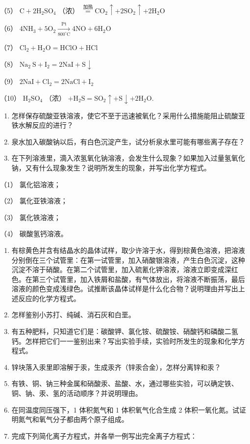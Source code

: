 （5） \(\mathrm{C} + 2\mathrm{H}_2\mathrm{SO}_4\) （浓）
\(\overset{\text{加热}}{=}\mathrm{CO}_2\uparrow +2\mathrm{SO}_2\uparrow +2\mathrm{H}_2\mathrm{O}\)

（6）
\(4\mathrm{NH}_{3} + 5\mathrm{O}_{2}\xrightarrow[\mathrm{800}^{\circ}\mathrm{C}]{\mathrm{Pt}}4\mathrm{NO} + 6\mathrm{H}_{2}\mathrm{O}\)

（7）
\(\mathrm{Cl}_2 + \mathrm{H}_2\mathrm{O} = \mathrm{HClO} + \mathrm{HCl}\)

（8）
\(\mathrm{Na}_{2} \mathrm{~S} + \mathrm{I}_{2} = 2 \mathrm{NaI} + \mathrm{S} \downarrow\)

（9） \(2\mathrm{NaI} + \mathrm{Cl}_2 = 2\mathrm{NaCl} + \mathrm{I}_2\)

（10） \(\mathrm{H}_2\mathrm{SO}_4\) （浓）
\(+\mathrm{H}_2\mathrm{S} = \mathrm{SO}_2\uparrow +\mathrm{S}\downarrow +2\mathrm{H}_2\mathrm{O}.\)

\begin{enumerate}[start=10]
\item
  怎样保存硫酸亚铁溶液，使它不至于迅速被氧化？采用什么措施能阻止硫酸亚铁水解反应的进行？
\item
  泉水加入碳酸钠以后，有白色沉淀产生，试分析泉水里可能有哪些离子存在？
\item
  在下列溶液里，滴入浓氢氧化钠溶液，会发生什么现象？如果加入过量氢氧化钠，又有什么现象发生？说明所发生的现象，并写出化学方程式。
\end{enumerate}

（1） 氯化铝溶液；

（2） 氯化亚铁溶液；

（3） 氯化铁溶液；

（4） 碳酸氢钙溶液。

\begin{enumerate}[start=13]
\item
  有棕黄色并含有结晶水的晶体试样，取少许溶于水，得到棕黄色溶液，把溶液分别倒在三个试管里：在第一试管里，加入硝酸银溶液，产生白色沉淀，这种沉淀不溶于硝酸。在第二个试管里，加入硫氰化钾溶液，溶液立即变成深红色。在第三个试管里，加入铁屑和盐酸，有气体放出，将溶液不断振荡，最后溶液的颜色变成浅绿色。试推断该晶体试样是什么化合物？说明理由并写出上述反应的化学方程式。
\item
  怎样鉴别小苏打、纯碱、消石灰和白垩。
\item
  有五种肥料，只知道它们是：碳酸钾、氯化铵、硫酸铵、硝酸钙和磷酸二氢钙。怎样把它们一一鉴别出来？写出实验手续，实验时所发生的现象和化学方程式。
\item
  锌块落入汞里即溶解于汞，生成汞齐（锌汞合金），怎样分离锌和汞？
\item
  有铁、铜、钠三种金属和硝酸汞、盐酸、水，通过哪些实验，可以确定铁、铜、钠、汞、氢的活动顺序？并说明理由。
\item
  在同温度同压强下，1 体积氮气和 1 体积氧气化合生成 2
  体积一氧化氮。试证明氮气和氧气分子都由两个原子组成。
\item
  完成下列简化离子方程式，并各举一例写出完全离子方程式：
\end{enumerate}

